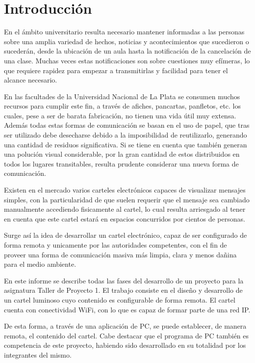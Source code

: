 \section{Introducción}
En el ámbito universitario resulta necesario mantener informadas a las personas sobre una amplia variedad de hechos, noticias y acontecimientos que sucedieron o sucederán, desde la ubicación de un aula hasta la notificación de la cancelación de una clase. Muchas veces estas notificaciones son sobre cuestiones muy efímeras, lo que requiere rapidez para empezar a transmitirlas y facilidad para tener el alcance necesario.

En las facultades de la Universidad Nacional de La Plata se consumen muchos recursos para cumplir este fin, a través de afiches, pancartas, panfletos, etc. los cuales, pese a ser de barata fabricación, no tienen una vida útil muy extensa. Además todas estas formas de comunicación se basan en el uso de papel, que tras ser utilizado debe desecharse debido a la imposibilidad de reutilizarlo, generando una cantidad de residuos significativa. Si se tiene en cuenta que también generan una polución visual considerable, por la gran cantidad de estos distribuidos en todos los lugares transitables, resulta prudente considerar una nueva forma de comunicación.


Existen en el mercado varios carteles electrónicos capaces de visualizar mensajes simples, con la particularidad de que suelen requerir que el mensaje sea cambiado manualmente accediendo fisicamente al cartel, lo cual resulta arriesgado al tener en cuenta que este cartel estará en espacios concurridos por cientos de personas.

Surge así la idea de desarrollar un cartel electrónico, capaz de ser configurado de forma remota y unicamente por las autoridades competentes, con el fin de proveer una forma de comunicación masiva más limpia, clara y menos dañina para el medio ambiente.

En este informe se describe todas las fases del desarrollo de un proyecto para la asignatura Taller de Proyecto 1. El trabajo consiste en el diseño y desarrollo de un cartel luminoso cuyo contenido es configurable de forma remota. El cartel cuenta con conectividad WiFi, con lo que es capaz de formar parte de una red IP.

De esta forma, a través de una aplicación de PC, se puede establecer, de manera remota, el contenido del cartel. Cabe destacar que el programa de PC también es competencia de este proyecto, habiendo sido desarrollado en su totalidad por los integrantes del mismo.

